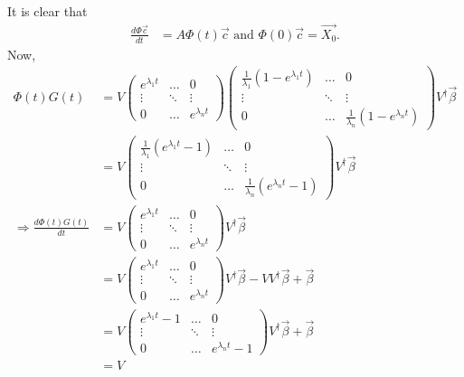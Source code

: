 \documentclass{article}
\begin{document}
\begin{pf}
It is clear that
\begin{align*}
\frac{d\Phi\vec{c}}{dt}&=A\Phi(t)\vec{c} \text{ and } \Phi(0)\vec{c}=\vec{X_0}.
\end{align*}
Now, 
\begin{align*}
\Phi(t)G(t)&=V
\left(\begin{array}{ccccc}
e^{\lambda_1 t}  &\dots &0
\\ \vdots & \ddots &\vdots
\\ 0 & \dots & e^{\lambda_nt}
 \end{array}\right)
 \left(\begin{array}{ccccc}
\frac{1}{\lambda_1}(1-e^{\lambda_1 t})  &\dots &0
\\ \vdots & \ddots &\vdots
\\ 0 & \dots &\frac{1}{\lambda_n} (1-e^{\lambda_nt})
 \end{array}\right)
 V^\dagger\vec{\beta}
 \\&=V
 \left(\begin{array}{ccccc}
\frac{1}{\lambda_1}(e^{\lambda_1 t}-1)  &\dots &0
\\ \vdots & \ddots &\vdots
\\ 0 & \dots &\frac{1}{\lambda_n} (e^{\lambda_nt}-1)
 \end{array}\right)
 V^\dagger\vec{\beta}
 \\ \Rightarrow \frac{d\Phi(t)G(t)}{dt}&=V
 \left(\begin{array}{ccccc}
e^{\lambda_1 t}  &\dots &0
\\ \vdots & \ddots &\vdots
\\ 0 & \dots &e^{\lambda_nt}
 \end{array}\right)V^\dagger\vec{\beta}
 \\&=V
 \left(\begin{array}{ccccc}
e^{\lambda_1 t}  &\dots &0
\\ \vdots & \ddots &\vdots
\\ 0 & \dots &e^{\lambda_nt}
 \end{array}\right)
 V^\dagger\vec{\beta} -VV^\dagger\vec{\beta}+\vec{\beta}
 \\&=V
 \left(\begin{array}{ccccc}
e^{\lambda_1 t}-1  &\dots &0
\\ \vdots & \ddots &\vdots
\\ 0 & \dots &e^{\lambda_nt}-1
 \end{array}\right)
 V^\dagger\vec{\beta} +\vec{\beta}
  \\&=V

\end{align*}
\end{pf}
\end{document}
